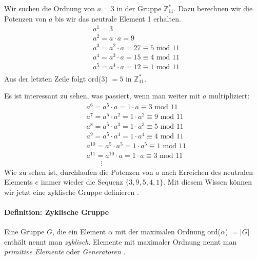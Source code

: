 Wir suchen die Ordnung von $a=3$ in der Gruppe $\mathbb{Z}^*_{11}$. Dazu berechnen wir die Potenzen von $a$ bis wir das neutrale Element 1 erhalten.
\begin{align*}
&a^1 = 3 \\
&a^2 = a \cdot a = 9\\
&a^3 = a^2 \cdot a =  27 \equiv 5 \text{ mod } 11\\
&a^4 = a^3 \cdot a =  15 \equiv 4 \text{ mod } 11\\
&a^5 = a^4 \cdot a =  12 \equiv 1 \text{ mod } 11\\
\end{align*}
Aus der letzten Zeile folgt ord(3) $= 5$ in $\mathbb{Z}^*_{11}$.

Es ist interessant zu sehen, was passiert, wenn man weiter mit $a$ multipliziert:
\begin{align*}
&a^6 = a^5 \cdot a = 1 \cdot a \equiv 3 \text{ mod } 11\\
&a^7 = a^5 \cdot a^2 = 1 \cdot a^2 \equiv 9 \text{ mod } 11\\
&a^8 = a^5 \cdot a^3 = 1 \cdot a^3 \equiv 5 \text{ mod } 11\\
&a^9 = a^5 \cdot a^4 = 1 \cdot a^4 \equiv 4 \text{ mod } 11\\
&a^{10} = a^5 \cdot a^5 = 1 \cdot a^5 \equiv 1 \text{ mod } 11\\
&a^{11} = a^{10} \cdot a = 1 \cdot a \equiv 3 \text{ mod } 11\\
&\qquad \vdots
\end{align*}
Wie zu sehen ist, durchlaufen die Potenzen von $a$ nach Erreichen des neutralen Elements $e$ immer wieder die Sequenz $\{3,9,5,4,1\}$. Mit diesem Wissen können wir jetzt eine zyklische Gruppe definieren \cite[S. 241, 242]{Paar.2016}.

\paragraph{Definition: Zyklische Gruppe}
Eine Gruppe $G$, die ein Element $\alpha$ mit der maximalen Ordnung ord($\alpha$) $= |G|$ enthält nennt man \textit{zyklisch}. Elemente mit maximaler Ordnung nennt man \textit{primitive Elemente} oder \textit{Generatoren} \cite[S. 242]{Paar.2016}.\\

